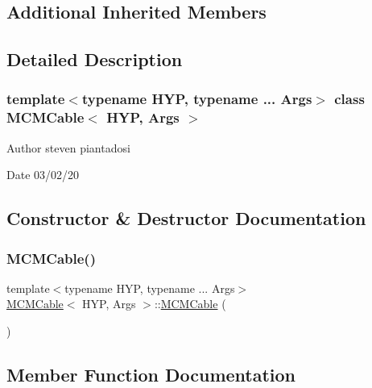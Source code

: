 \subsection*{Additional Inherited Members}


\subsection{Detailed Description}
\subsubsection*{template$<$typename H\+YP, typename ... Args$>$\newline
class M\+C\+M\+Cable$<$ H\+Y\+P, Args $>$}

\begin{DoxyAuthor}{Author}
steven piantadosi 
\end{DoxyAuthor}
\begin{DoxyDate}{Date}
03/02/20 
\end{DoxyDate}


\subsection{Constructor \& Destructor Documentation}
\mbox{\label{class_m_c_m_cable_aac715433bffb674dd5809e7c1bc59ae5}} 
\subsubsection{\texorpdfstring{M\+C\+M\+Cable()}{MCMCable()}}
{\footnotesize\ttfamily template$<$typename H\+YP, typename ... Args$>$ \\
\hyperlink{class_m_c_m_cable}{M\+C\+M\+Cable}$<$ H\+YP, Args $>$\+::\hyperlink{class_m_c_m_cable}{M\+C\+M\+Cable} (\begin{DoxyParamCaption}{ }\end{DoxyParamCaption})\hspace{0.3cm}{\ttfamily [inline]}}



\subsection{Member Function Documentation}
\mbox{\label{class_m_c_m_cable_aa73001ec3bb0cf0c618281dfa998f2f1}} 

